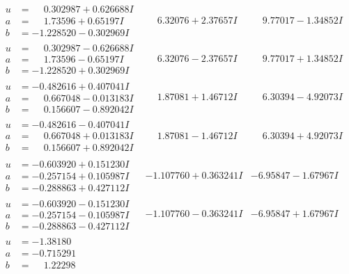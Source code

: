 \documentclass[1p]{elsarticle_modified}
\theoremstyle{definition}
\begin{document}
$$\begin{array}{c|c|c}
\begin{aligned}
u &= \phantom{-}0.302987 + 0.626688 I \\
a &= \phantom{-}1.73596 + 0.65197 I \\
b &= -1.228520 - 0.302969 I\end{aligned}
 & \phantom{-}6.32076 + 2.37657 I & \phantom{-}9.77017 - 1.34852 I \\ \hline\begin{aligned}
u &= \phantom{-}0.302987 - 0.626688 I \\
a &= \phantom{-}1.73596 - 0.65197 I \\
b &= -1.228520 + 0.302969 I\end{aligned}
 & \phantom{-}6.32076 - 2.37657 I & \phantom{-}9.77017 + 1.34852 I \\ \hline\begin{aligned}
u &= -0.482616 + 0.407041 I \\
a &= \phantom{-}0.667048 - 0.013183 I \\
b &= \phantom{-}0.156607 - 0.892042 I\end{aligned}
 & \phantom{-}1.87081 + 1.46712 I & \phantom{-}6.30394 - 4.92073 I \\ \hline\begin{aligned}
u &= -0.482616 - 0.407041 I \\
a &= \phantom{-}0.667048 + 0.013183 I \\
b &= \phantom{-}0.156607 + 0.892042 I\end{aligned}
 & \phantom{-}1.87081 - 1.46712 I & \phantom{-}6.30394 + 4.92073 I \\ \hline\begin{aligned}
u &= -0.603920 + 0.151230 I \\
a &= -0.257154 + 0.105987 I \\
b &= -0.288863 + 0.427112 I\end{aligned}
 & -1.107760 + 0.363241 I & -6.95847 - 1.67967 I \\ \hline\begin{aligned}
u &= -0.603920 - 0.151230 I \\
a &= -0.257154 - 0.105987 I \\
b &= -0.288863 - 0.427112 I\end{aligned}
 & -1.107760 - 0.363241 I & -6.95847 + 1.67967 I \\ \hline\begin{aligned}
u &= -1.38180\phantom{ +0.000000I} \\
a &= -0.715291\phantom{ +0.000000I} \\
b &= \phantom{-}1.22298\phantom{ +0.000000I}\end{aligned}

\end{array}$$
\end{document}
